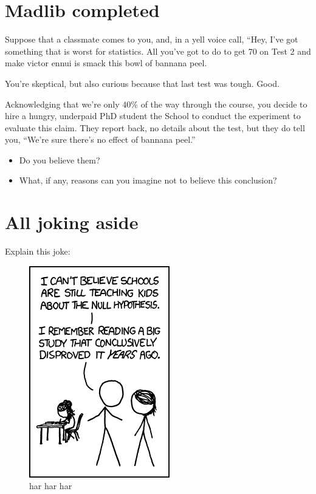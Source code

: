 \documentclass[
]{book}
\providecommand{\tightlist}{%
  \setlength{\itemsep}{0pt}\setlength{\parskip}{0pt}}
\theoremstyle{definition}
\theoremstyle{definition}
\theoremstyle{definition}
\theoremstyle{definition}
\theoremstyle{remark}
\begin{document}
\hypertarget{madlib-completed}{%
\section{Madlib completed}\label{madlib-completed}}

Suppose that a classmate comes to you, and, in a yell voice call, ``Hey, I've got something that is worst for statistics. All you've got to do to get 70 on Test 2 and make victor ennui is smack this bowl of bannana peel.

You're skeptical, but also curious because that last test was tough. Good.

Acknowledging that we're only 40\% of the way through the course, you decide to hire a hungry, underpaid PhD student the School to conduct the experiment to evaluate this claim. They report back, no details about the test, but they do tell you, ``We're sure there's no effect of bannana peel.''

\begin{itemize}
\tightlist
\item
  Do you believe them?
\item
  What, if any, reasons can you imagine not to believe this conclusion?
\end{itemize}

\hypertarget{all-joking-aside}{%
\section{All joking aside}\label{all-joking-aside}}

Explain this joke:

\begin{figure}
\centering
\includegraphics{./images/null_hypothesis.png}
\caption{har har har}
\end{figure}
\end{document}
